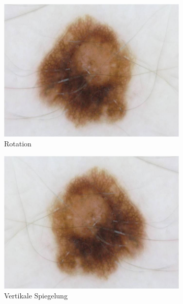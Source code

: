 \begin{figure}[t!]
\begin{subfigure}{0.24\linewidth}
		\includegraphics[width=\textwidth]{./pics/augmentations/rotation.png}
		\caption{Rotation}
		\label{subfig:aug_rot}
	\end{subfigure}
	\begin{subfigure}{0.24\linewidth}
		\includegraphics[width=\textwidth]{./pics/augmentations/vertical_flip.png}
		\caption{Vertikale Spiegelung}
		\label{subfig:aug_v_flip}
	\end{subfigure}
	\begin{subfigure}{0.24\linewidth}

\end{subfigure}
\end{figure}
